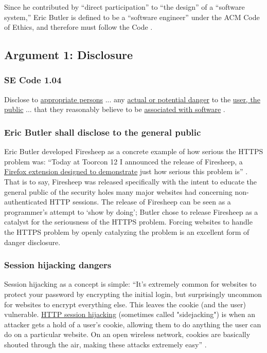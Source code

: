 \documentclass[11pt]{article}
\begin{document}
\begin{multicols}{2}
Since he contributed by ``direct participation'' to ``the design'' of a ``software system,'' Eric Butler is defined to be a ``software engineer'' under the ACM Code of Ethics, and therefore must follow the Code \cite{se-code}.


\subsection{Argument 1: Disclosure}
\subsubsection*{SE Code 1.04}
Disclose to \uline{appropriate persons} ... any \uline{actual or potential danger} to the \uline{user, the public} ... that they reasonably believe to be \uline{associated with software} \cite{se-code}. 

\subsubsection*{Eric Butler shall disclose to the general public}
Eric Butler developed Firesheep as a concrete example of how serious the HTTPS problem was: ``Today at Toorcon 12 I announced the release of Firesheep, a \uline{Firefox extension designed to demonstrate} just how serious this problem is'' \cite{eric-butler}. That is to say, Firesheep was released specifically with the intent to educate the general public of the security holes many major websites had concerning non-authenticated HTTP sessions. The release of Firesheep can be seen as a programmer's attempt to `show by doing'; Butler chose to release Firesheep as a catalyst for the seriousness of the HTTPS problem. Forcing websites to handle the HTTPS problem by openly catalyzing the problem is an excellent form of danger disclosure.

\subsubsection*{Session hijacking dangers}
Session hijacking as a concept is simple: ``It's extremely common for websites to protect your password by encrypting the initial login, but surprisingly uncommon for websites to encrypt everything else. This leaves the cookie (and the user) vulnerable. \uline{HTTP session hijacking} (sometimes called "sidejacking") is when an attacker gets a hold of a user's cookie, allowing them to do anything the user can do on a particular website. On an open wireless network, cookies are basically shouted through the air, making these attacks extremely easy'' \cite{eric-butler}.


\end{multicols}
\end{document}
